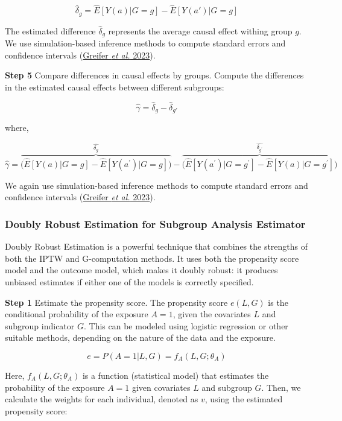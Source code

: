 \documentclass[
  singlecolumn]{article}
\begin{document}
\[\hat{\delta}_g = \hat{E}[Y(a)|G=g] - \hat{E}[Y(a')|G=g]\]

The estimated difference \(\hat{\delta}_g\) represents the average
causal effect withing group \(g\). We use simulation-based inference
methods to compute standard errors and confidence intervals
(\hyperref[ref-greifer2023]{Greifer \emph{et al.} 2023}).

\textbf{Step 5} Compare differences in causal effects by groups. Compute
the differences in the estimated causal effects between different
subgroups:

\[\hat{\gamma} = \hat{\delta}_g - \hat{\delta}_{g'}\]

where,

\[\hat{\gamma} = \overbrace{\big( \hat{E}[Y(a)|G=g] - \hat{E}[Y(a^{\prime})|G=g] \big)}^{\hat{\delta_g}} - \overbrace{\big(\hat{E}[Y(a^{\prime})|G=g^{\prime}]- \hat{E}[Y(a)|G=g^{\prime}]\big)}^{\hat{\delta_{g^{\prime}}}}\]

We again use simulation-based inference methods to compute standard
errors and confidence intervals (\hyperref[ref-greifer2023]{Greifer
\emph{et al.} 2023}).

\subsubsection{Doubly Robust Estimation for Subgroup Analysis
Estimator}\label{doubly-robust-estimation-for-subgroup-analysis-estimator}

Doubly Robust Estimation is a powerful technique that combines the
strengths of both the IPTW and G-computation methods. It uses both the
propensity score model and the outcome model, which makes it doubly
robust: it produces unbiased estimates if either one of the models is
correctly specified.

\textbf{Step 1} Estimate the propensity score. The propensity score
\(e(L, G)\) is the conditional probability of the exposure \(A = 1\),
given the covariates \(L\) and subgroup indicator \(G\). This can be
modeled using logistic regression or other suitable methods, depending
on the nature of the data and the exposure.

\[e = P(A = 1 | L, G) = f_A(L, G; \theta_A)\]

Here, \(f_A(L, G; \theta_A)\) is a function (statistical model) that
estimates the probability of the exposure \(A = 1\) given covariates
\(L\) and subgroup \(G\). Then, we calculate the weights for each
individual, denoted as \(v\), using the estimated propensity score:
\end{document}
